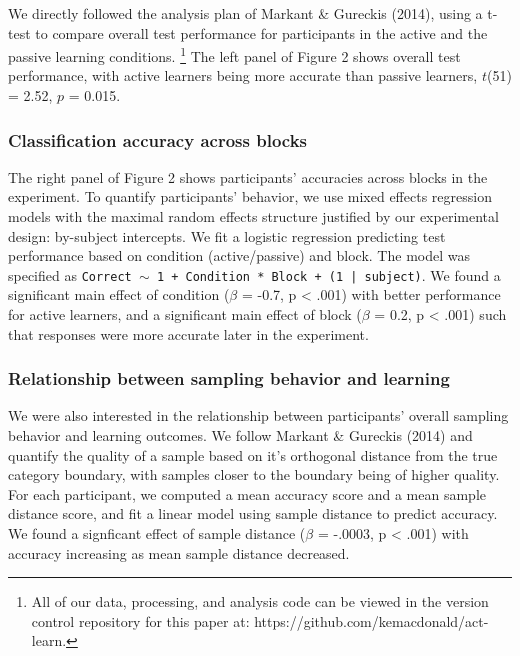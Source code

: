 \documentclass[10pt, letterpaper]{article}
\begin{document}
We directly followed the analysis plan of Markant \& Gureckis (2014),
using a t-test to compare overall test performance for participants in
the active and the passive learning conditions.
\footnote{All of our data, processing, and analysis code can be viewed in the version control repository for this paper at: https://github.com/kemacdonald/act-learn.}
The left panel of Figure 2 shows overall test performance, with active
learners being more accurate than passive learners, \(t\)(51) = 2.52,
\(p\) = 0.015.

\subsubsection{Classification accuracy across
blocks}\label{classification-accuracy-across-blocks}

The right panel of Figure 2 shows participants' accuracies across blocks
in the experiment. To quantify participants' behavior, we use mixed
effects regression models with the maximal random effects structure
justified by our experimental design: by-subject intercepts. We fit a
logistic regression predicting test performance based on condition
(active/passive) and block. The model was specified as
\texttt{Correct $\sim$ 1 + Condition * Block + (1 | subject)}. We found
a significant main effect of condition (\(\beta\) = -0.7, p \textless{}
.001) with better performance for active learners, and a significant
main effect of block (\(\beta\) = 0.2, p \textless{} .001) such that
responses were more accurate later in the experiment.

\subsubsection{Relationship between sampling behavior and
learning}\label{relationship-between-sampling-behavior-and-learning}

We were also interested in the relationship between participants'
overall sampling behavior and learning outcomes. We follow Markant \&
Gureckis (2014) and quantify the quality of a sample based on it's
orthogonal distance from the true category boundary, with samples closer
to the boundary being of higher quality. For each participant, we
computed a mean accuracy score and a mean sample distance score, and fit
a linear model using sample distance to predict accuracy. We found a
signficant effect of sample distance (\(\beta\) = -.0003, p \textless{}
.001) with accuracy increasing as mean sample distance decreased.
\end{document}
